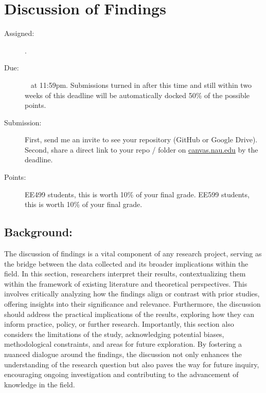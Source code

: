 \documentclass[11pt]{article}
\begin{document}
\section{Discussion of Findings}
\begin{description}
	\item [Assigned:] \wkThirteenTu. %
	\item [Due:] \wkFourteenTu~ at 11:59pm. Submissions turned in after this time and still within two weeks of this deadline will be automatically docked 50\% of the possible points. %
	\item [Submission:] First, send me an invite to see your repository (GitHub or Google Drive).  Second, share a direct link to your repo / folder on \href{https://canvas.nau.edu}{canvas.nau.edu} by the deadline.
	\item [Points:] EE499 students, this is worth 10\% of your final grade.  EE599 students, this is worth 10\% of your final grade.
\end{description}

\subsection*{Background:}
The discussion of findings is a vital component of any research project, serving as the bridge between the data collected and its broader implications within the field. In this section, researchers interpret their results, contextualizing them within the framework of existing literature and theoretical perspectives. This involves critically analyzing how the findings align or contrast with prior studies, offering insights into their significance and relevance. Furthermore, the discussion should address the practical implications of the results, exploring how they can inform practice, policy, or further research. Importantly, this section also considers the limitations of the study, acknowledging potential biases, methodological constraints, and areas for future exploration. By fostering a nuanced dialogue around the findings, the discussion not only enhances the understanding of the research question but also paves the way for future inquiry, encouraging ongoing investigation and contributing to the advancement of knowledge in the field.
\end{document}

